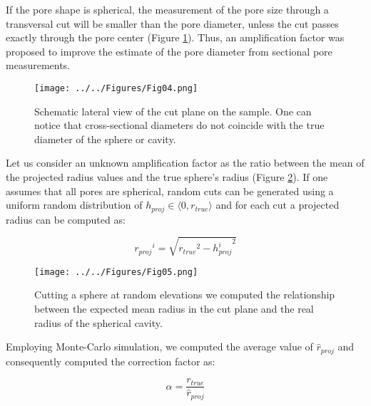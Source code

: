 \documentclass[review]{elsarticle}
\begin{document}
If the pore shape is spherical, the measurement of the pore size through a transversal cut will be smaller than the pore diameter, unless the cut passes exactly through the pore center (Figure \ref{FoamCutPlane}). Thus, an amplification factor was proposed to improve the estimate of the pore diameter from sectional pore measurements.

\begin{figure}[htbp]
	\begin{center}
		\texttt{[image: ../../Figures/Fig04.png]}
		\caption{Schematic lateral view of the cut plane on the sample. One can notice that cross-sectional diameters do not coincide with the true diameter of the sphere or cavity.}
		\label{FoamCutPlane}
	\end{center}
\end{figure}


Let us consider an unknown amplification factor as the ratio between the mean of the projected radius values and the true sphere’s radius (Figure \ref{RandomPlaneCut}). If one assumes that all pores are spherical, random cuts can be generated using a uniform random distribution of $h_{proj} \in \langle 0,r_{true} \rangle$ and for each cut a projected radius can be computed as:

\begin{equation}\label{Eq11}
{r_{proj}}^i=\sqrt{{r_{true}}^2-{h_{proj}^i}^2}
\end{equation}


\begin{figure}[htbp]
	\begin{center}
		\texttt{[image: ../../Figures/Fig05.png]}
		\caption{Cutting a sphere at random elevations we computed the relationship between the expected mean radius in the cut plane and the real radius of the spherical cavity.}
		\label{RandomPlaneCut}
	\end{center}
\end{figure}

Employing Monte-Carlo simulation, we computed the average value of $\hat{r}_{proj}$  and consequently computed the correction factor as:

\begin{equation}\label{Eq12}
\alpha=\frac{r_{true}}{\hat{r}_{proj}}
\end{equation}
\end{document}
